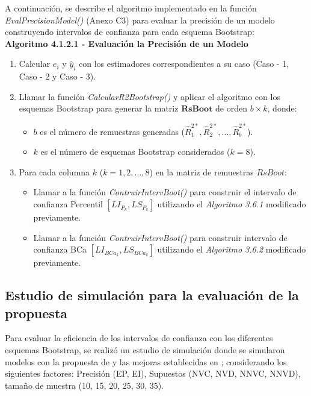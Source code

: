 A continuación, se describe el algoritmo implementado en la función \textit{EvalPrecisionModel()} (Anexo C3) para evaluar la precisión de un modelo construyendo intervalos de confianza para cada esquema Bootstrap:\\


\textbf{Algoritmo 4.1.2.1 - Evaluación la Precisión de un Modelo}

\begin{enumerate}
	
	\item Calcular $e_i$ y $\hat{y}_{i}$ con los estimadores correspondientes a su caso (Caso - 1, Caso - 2 y Caso - 3).
	
	\item Llamar la función \textit{CalcularR2Bootstrap()} y aplicar el algoritmo con los esquemas Bootstrap para generar la matriz \( \mathbf{RsBoot} \) de orden \( b \times k \), donde:
	\begin{itemize}
		\item \( b \) es el número de remuestras generadas (\( \hat{R}^{2*}_{1}, \hat{R}^{2*}_{2}, \dots, \hat{R}^{2*}_{b} \)).
		\item \( k \) es el número de esquemas Bootstrap considerados (\( k = 8 \)).
	\end{itemize}
	
	\item Para cada columna \( k \) (\( k = 1, 2, \dots, 8 \)) en la matriz de remuestras \( RsBoot \):
	\begin{itemize}
		\item  Llamar a la función \textit{ContruirIntervBoot()} para construir el intervalo de confianza Percentil \( [LI_{P_k}, LS_{P_k}] \) utilizando el \textit{Algoritmo 3.6.1} modificado previamente.
		\item Llamar a la función \textit{ContruirIntervBoot()} para construir intervalo de confianza BCa \( [LI_{BCa_k}, LS_{BCa_k}] \) utilizando el \textit{Algoritmo 3.6.2} modificado previamente.
	\end{itemize}
\end{enumerate}





	 
\subsection{Estudio de simulación para la evaluación de la propuesta}

Para evaluar la eficiencia de los intervalos de confianza con los diferentes esquemas Bootstrap, se realizó un estudio de simulación donde se simularon modelos con la propuesta de \textcite{febles-2014} y las mejoras establecidas en \textcite{zacarias-2023}; considerando los siguientes factores: Precisión (EP, EI), Supuestos (NVC, NVD, NNVC, NNVD), tamaño de muestra (10, 15, 20, 25, 30, 35).\\


